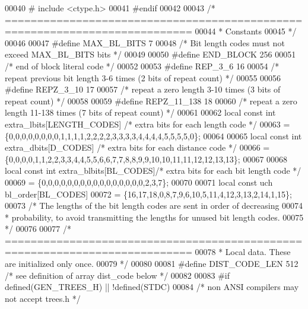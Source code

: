 \begin{DoxyCode}
00040 \textcolor{preprocessor}{#  include <ctype.h>}
00041 \textcolor{preprocessor}{#endif}
00042 
00043 \textcolor{comment}{/* ===========================================================================}
00044 \textcolor{comment}{ * Constants}
00045 \textcolor{comment}{ */}
00046 
00047 \textcolor{preprocessor}{#define MAX\_BL\_BITS 7}
00048 \textcolor{comment}{/* Bit length codes must not exceed MAX\_BL\_BITS bits */}
00049 
00050 \textcolor{preprocessor}{#define END\_BLOCK 256}
00051 \textcolor{comment}{/* end of block literal code */}
00052 
00053 \textcolor{preprocessor}{#define REP\_3\_6      16}
00054 \textcolor{comment}{/* repeat previous bit length 3-6 times (2 bits of repeat count) */}
00055 
00056 \textcolor{preprocessor}{#define REPZ\_3\_10    17}
00057 \textcolor{comment}{/* repeat a zero length 3-10 times  (3 bits of repeat count) */}
00058 
00059 \textcolor{preprocessor}{#define REPZ\_11\_138  18}
00060 \textcolor{comment}{/* repeat a zero length 11-138 times  (7 bits of repeat count) */}
00061 
00062 local \textcolor{keyword}{const} \textcolor{keywordtype}{int} extra\_lbits[LENGTH\_CODES] \textcolor{comment}{/* extra bits for each length code */}
00063    = \{0,0,0,0,0,0,0,0,1,1,1,1,2,2,2,2,3,3,3,3,4,4,4,4,5,5,5,5,0\};
00064 
00065 local \textcolor{keyword}{const} \textcolor{keywordtype}{int} extra\_dbits[D\_CODES] \textcolor{comment}{/* extra bits for each distance code */}
00066    = \{0,0,0,0,1,1,2,2,3,3,4,4,5,5,6,6,7,7,8,8,9,9,10,10,11,11,12,12,13,13\};
00067 
00068 local \textcolor{keyword}{const} \textcolor{keywordtype}{int} extra\_blbits[BL\_CODES]\textcolor{comment}{/* extra bits for each bit length code */}
00069    = \{0,0,0,0,0,0,0,0,0,0,0,0,0,0,0,0,2,3,7\};
00070 
00071 local \textcolor{keyword}{const} uch bl\_order[BL\_CODES]
00072    = \{16,17,18,0,8,7,9,6,10,5,11,4,12,3,13,2,14,1,15\};
00073 \textcolor{comment}{/* The lengths of the bit length codes are sent in order of decreasing}
00074 \textcolor{comment}{ * probability, to avoid transmitting the lengths for unused bit length codes.}
00075 \textcolor{comment}{ */}
00076 
00077 \textcolor{comment}{/* ===========================================================================}
00078 \textcolor{comment}{ * Local data. These are initialized only once.}
00079 \textcolor{comment}{ */}
00080 
00081 \textcolor{preprocessor}{#define DIST\_CODE\_LEN  512 }\textcolor{comment}{/* see definition of array dist\_code below */}\textcolor{preprocessor}{}
00082 
00083 \textcolor{preprocessor}{#if defined(GEN\_TREES\_H) || !defined(STDC)}
00084 \textcolor{comment}{/* non ANSI compilers may not accept trees.h */}

\end{DoxyCode}
